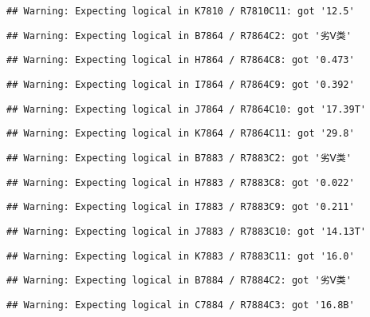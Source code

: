 \documentclass[
]{article}
\begin{document}
\begin{verbatim}
## Warning: Expecting logical in K7810 / R7810C11: got '12.5'
\end{verbatim}

\begin{verbatim}
## Warning: Expecting logical in B7864 / R7864C2: got '劣Ⅴ类'
\end{verbatim}

\begin{verbatim}
## Warning: Expecting logical in H7864 / R7864C8: got '0.473'
\end{verbatim}

\begin{verbatim}
## Warning: Expecting logical in I7864 / R7864C9: got '0.392'
\end{verbatim}

\begin{verbatim}
## Warning: Expecting logical in J7864 / R7864C10: got '17.39T'
\end{verbatim}

\begin{verbatim}
## Warning: Expecting logical in K7864 / R7864C11: got '29.8'
\end{verbatim}

\begin{verbatim}
## Warning: Expecting logical in B7883 / R7883C2: got '劣Ⅴ类'
\end{verbatim}

\begin{verbatim}
## Warning: Expecting logical in H7883 / R7883C8: got '0.022'
\end{verbatim}

\begin{verbatim}
## Warning: Expecting logical in I7883 / R7883C9: got '0.211'
\end{verbatim}

\begin{verbatim}
## Warning: Expecting logical in J7883 / R7883C10: got '14.13T'
\end{verbatim}

\begin{verbatim}
## Warning: Expecting logical in K7883 / R7883C11: got '16.0'
\end{verbatim}

\begin{verbatim}
## Warning: Expecting logical in B7884 / R7884C2: got '劣Ⅴ类'
\end{verbatim}

\begin{verbatim}
## Warning: Expecting logical in C7884 / R7884C3: got '16.8B'
\end{verbatim}
\end{document}
